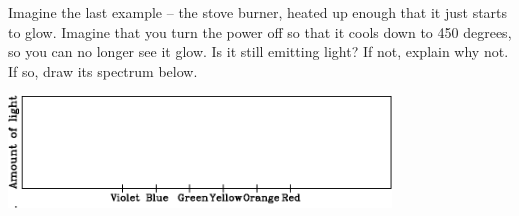 \documentclass[11pt]{article}
\begin{document}
Imagine the last example -- the stove burner, heated up enough that it just starts to glow. Imagine that you turn the power off so that it cools down to
450 degrees, so you can no longer see it glow. Is it still emitting light? If not, explain why not. If so, draw its spectrum below.

\begin{center}

\includegraphics[width=4in]{broad-spectrum-crop.pdf}

\end{center}
\end{document}
